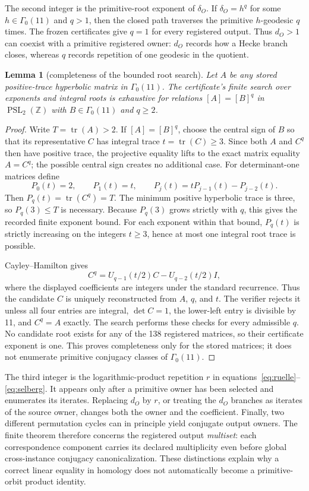 \documentclass[11pt]{article}
\newtheorem{lemma}[theorem]{Lemma}
\theoremstyle{definition}
\theoremstyle{remark}
\newcommand{\G}{\Gamma_0(11)}
\begin{document}
The second integer is the primitive-root exponent of $\delta_O$. If $\delta_O=h^q$ for some $h\in\G$ and $q>1$, then the closed path traverses the primitive $h$-geodesic $q$ times. The frozen certificates give $q=1$ for every registered output. Thus $d_O>1$ can coexist with a primitive registered owner: $d_O$ records how a Hecke branch closes, whereas $q$ records repetition of one geodesic in the quotient.

\begin{lemma}[completeness of the bounded root search]\label{lem:root-completeness}
Let $A$ be any stored positive-trace hyperbolic matrix in $\G$. The certificate's finite search over exponents and integral roots is exhaustive for relations $[A]=[B]^q$ in $\operatorname{PSL}_2(\mathbb Z)$ with $B\in\G$ and $q\geq2$.
\end{lemma}

\begin{proof}
Write $T=\operatorname{tr}(A)>2$. If $[A]=[B]^q$, choose the central sign of $B$ so that its representative $C$ has integral trace $t=\operatorname{tr}(C)\geq3$. Since both $A$ and $C^q$ then have positive trace, the projective equality lifts to the exact matrix equality $A=C^q$; the possible central sign creates no additional case. For determinant-one matrices define
\[
P_0(t)=2,\qquad P_1(t)=t,\qquad
P_j(t)=tP_{j-1}(t)-P_{j-2}(t).
\]
Then $P_q(t)=\operatorname{tr}(C^q)=T$. The minimum positive hyperbolic trace is three, so $P_q(3)\leq T$ is necessary. Because $P_q(3)$ grows strictly with $q$, this gives the recorded finite exponent bound. For each exponent within that bound, $P_q(t)$ is strictly increasing on the integers $t\geq3$, hence at most one integral root trace is possible.

Cayley--Hamilton gives
\[
C^q=U_{q-1}(t/2)C-U_{q-2}(t/2)I,
\]
where the displayed coefficients are integers under the standard recurrence. Thus the candidate $C$ is uniquely reconstructed from $A$, $q$, and $t$. The verifier rejects it unless all four entries are integral, $\det C=1$, the lower-left entry is divisible by 11, and $C^q=A$ exactly. The search performs these checks for every admissible $q$. No candidate root exists for any of the 138 registered matrices, so their certificate exponent is one. This proves completeness only for the stored matrices; it does not enumerate primitive conjugacy classes of $\G$.
\end{proof}

The third integer is the logarithmic-product repetition $r$ in equations~\eqref{eq:ruelle}--\eqref{eq:selberg}. It appears only after a primitive owner has been selected and enumerates its iterates. Replacing $d_O$ by $r$, or treating the $d_O$ branches as iterates of the source owner, changes both the owner and the coefficient. Finally, two different permutation cycles can in principle yield conjugate output owners. The finite theorem therefore concerns the registered output \emph{multiset}: each correspondence component carries its declared multiplicity even before global cross-instance conjugacy canonicalization. These distinctions explain why a correct linear equality in homology does not automatically become a primitive-orbit product identity.
\end{document}

